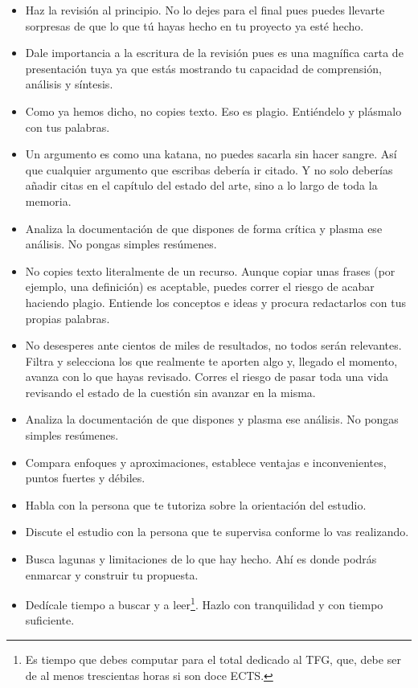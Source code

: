 \begin{itemize}
    \item Haz la revisión al principio. No lo dejes para el final pues puedes llevarte sorpresas de que lo que tú hayas hecho en tu proyecto ya esté hecho.
    \item Dale importancia a la escritura de la revisión pues es una magnífica carta de presentación tuya ya que estás mostrando tu capacidad de comprensión, análisis y síntesis.
    \item Como ya hemos dicho, no copies texto. Eso es plagio. Entiéndelo y plásmalo con tus palabras.
    \item Un argumento es como una katana, no puedes sacarla sin hacer sangre. Así que cualquier argumento que escribas debería ir citado. Y no solo deberías añadir citas en el capítulo del estado del arte, sino a lo largo de toda la memoria.
    \item Analiza la documentación de que dispones de forma crítica y plasma ese análisis. No pongas simples resúmenes.
    \item No copies texto literalmente de un recurso. Aunque copiar unas frases (por ejemplo, una definición) es aceptable, puedes correr el riesgo de acabar haciendo plagio.  Entiende los conceptos e ideas y procura redactarlos con tus propias palabras.
    \item No desesperes ante cientos de  miles de resultados, no todos serán relevantes. Filtra y selecciona los que realmente te aporten algo y, llegado el momento, avanza con lo que hayas revisado. Corres el riesgo de pasar toda una vida revisando el estado de la cuestión sin avanzar en la misma.   
    \item Analiza la documentación de que dispones y plasma ese análisis. No pongas simples resúmenes.
    \item Compara enfoques y aproximaciones, establece ventajas e inconvenientes, puntos fuertes y débiles.
    \item Habla con la persona que te tutoriza sobre la orientación del estudio. 
    \item Discute el estudio con la persona que te supervisa conforme lo vas realizando.
    \item Busca lagunas y limitaciones de lo que hay hecho. Ahí es donde podrás enmarcar y construir tu propuesta.
    \item Dedícale tiempo a buscar y a leer\footnote{Es tiempo que debes computar para el total dedicado al TFG, que, debe ser de al menos trescientas horas si son doce ECTS.}. Hazlo con tranquilidad y con tiempo suficiente.  

\end{itemize}
